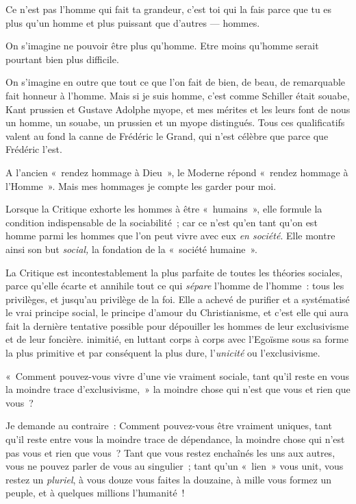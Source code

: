 \documentclass[french,twoside]{book} %
\begin{document}
Ce n’est pas l’homme qui fait ta grandeur, c’est toi qui la fais parce que tu es plus qu’un homme et plus puissant que d’autres — hommes.\par
On s’imagine ne pouvoir être plus qu’homme. Etre moins qu’homme serait pourtant bien plus difficile.\par
On s’imagine en outre que tout ce que l’on fait de bien, de beau, de remarquable fait honneur à l’homme. Mais si je suis homme, c’est comme Schiller était souabe, Kant prussien et Gustave Adolphe myope, et mes mérites et les leurs font de nous un homme, un souabe, un prussien et un myope distingués. Tous ces qualificatifs valent au fond la canne de Frédéric le Grand, qui n’est célèbre que parce que Frédéric l’est.\par
A l’ancien « rendez hommage à Dieu », le Moderne répond « rendez hommage à l’Homme ». Mais mes hommages je compte les garder pour moi.\par
 Lorsque la Critique exhorte les hommes à être « humains », elle formule la condition indispensable de la sociabilité ; car ce n’est qu’en tant qu’on est homme parmi les hommes que l’on peut vivre avec eux \emph{en société}. Elle montre ainsi son but \emph{social,} la fondation de la « société humaine ».\par
La Critique est incontestablement la plus parfaite de toutes les théories sociales, parce qu’elle écarte et annihile tout ce qui \emph{sépare} l’homme de l’homme : tous les privilèges, et jusqu’au privilège de la foi. Elle a achevé de purifier et a systématisé le vrai principe social, le principe d’amour du Christianisme, et c’est elle qui aura fait la dernière tentative possible pour dépouiller les hommes de leur exclusivisme et de leur foncière. inimitié, en luttant corps à corps avec l’Egoïsme sous sa forme la plus primitive et par conséquent la plus dure, l’\emph{unicité} ou l’exclusivisme.\par
« Comment pouvez-vous vivre d’une vie vraiment sociale, tant qu’il reste en vous la moindre trace d’exclusivisme, » la moindre chose qui n’est que vous et rien que vous ?\par
Je demande au contraire : Comment pouvez-vous être vraiment uniques, tant qu’il reste entre vous la moindre trace de dépendance, la moindre chose qui n’est pas vous et rien que vous ? Tant que vous restez enchaînés les uns aux autres, vous ne pouvez parler de vous au singulier ; tant qu’un « lien » vous unit, vous restez un \emph{pluriel}, à vous douze vous faites la douzaine, à mille vous formez un peuple, et à quelques millions l’humanité !\par
\end{document}
